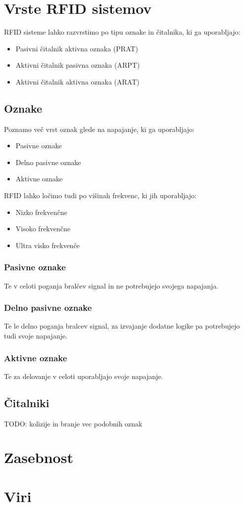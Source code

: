 \documentclass[]{article}
\begin{document}
\section{Vrste RFID sistemov}

RFID sisteme lahko razvrstimo po tipu oznake in \v{c}italnika, ki ga
uporabljajo:
\begin{itemize}
  \item Pasivni \v{c}italnik aktivna oznaka (PRAT)
  \item Aktivni \v{c}italnik pasivna oznaka (ARPT)
  \item Aktivni \v{c}italnik aktivna oznaka (ARAT)
\end{itemize}


\subsection{Oznake}
Poznamo ve\v{c} vrst oznak glede na napajanje, ki ga uporabljajo:
\begin{itemize}
  \item Pasivne oznake
  \item Delno pasivne oznake
  \item Aktivne oznake
\end{itemize}

\noindent
RFID lahko lo\v{c}imo tudi po vi\v{s}inah frekvenc, ki jih
uporabljajo:
\begin{itemize}
  \item Nizko frekven\v{c}ne
  \item Visoko frekven\v{c}ne
  \item Ultra visko frekven\v{c}e
\end{itemize}


\subsubsection{Pasivne oznake}
Te v celoti poganja bral\v{c}ev signal in ne potrebujejo svojega
napajanja.


\subsubsection{Delno pasivne oznake}
Te le delno poganja bralcev signal, za izvajanje dodatne logike
pa potrebujejo tudi svoje napajanje.


\subsubsection{Aktivne oznake}
Te za delovanje v celoti uporabljajo svoje napajanje.

\subsection{\v{C}italniki}

TODO: kolizije in branje vec podobnih oznak

\section{Zasebnost}

\clearpage

\section{Viri}
\printbibliography[heading=none] %
\end{document}
